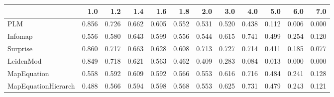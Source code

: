 \begin{tabular}{lrrrrrrrrrrr}
\toprule
{} &   1.0 &   1.2 &   1.4 &   1.6 &   1.8 &   2.0 &   3.0 &   4.0 &   5.0 &   6.0 &   7.0 \\
\midrule
PLM                 & 0.856 & 0.726 & 0.662 & 0.605 & 0.552 & 0.531 & 0.520 & 0.438 & 0.112 & 0.006 & 0.000 \\
Infomap             & 0.556 & 0.580 & 0.643 & 0.599 & 0.556 & 0.544 & 0.615 & 0.741 & 0.499 & 0.254 & 0.120 \\
Surprise            & 0.860 & 0.717 & 0.663 & 0.628 & 0.608 & 0.713 & 0.727 & 0.714 & 0.411 & 0.185 & 0.077 \\
LeidenMod           & 0.849 & 0.718 & 0.621 & 0.563 & 0.462 & 0.409 & 0.283 & 0.084 & 0.013 & 0.000 & 0.000 \\
MapEquation         & 0.558 & 0.592 & 0.609 & 0.592 & 0.566 & 0.553 & 0.616 & 0.716 & 0.484 & 0.241 & 0.128 \\
MapEquationHierarch & 0.488 & 0.566 & 0.594 & 0.598 & 0.568 & 0.553 & 0.625 & 0.731 & 0.479 & 0.243 & 0.121 \\
\bottomrule
\end{tabular}
